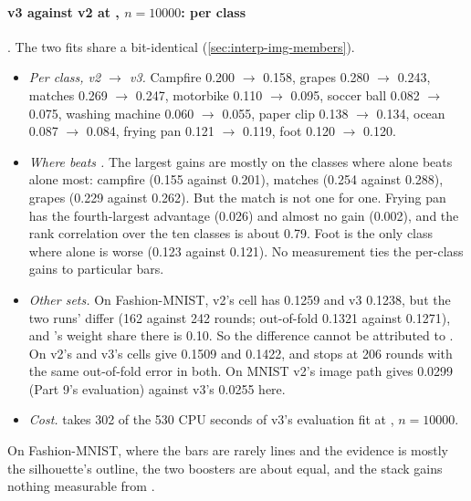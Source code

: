 \paragraph{v3 against v2 at , $n=10000$: per class} . The two fits share a bit-identical  (\cref{sec:interp-img-members}).
\begin{itemize}
\item \emph{Per class, v2 $\to$ v3.} Campfire 0.200 $\to$ 0.158, grapes 0.280 $\to$ 0.243, matches 0.269 $\to$ 0.247, motorbike 0.110 $\to$ 0.095, soccer ball 0.082 $\to$ 0.075, washing machine 0.060 $\to$ 0.055, paper clip 0.138 $\to$ 0.134, ocean 0.087 $\to$ 0.084, frying pan 0.121 $\to$ 0.119, foot 0.120 $\to$ 0.120.
\item \emph{Where  beats .} The largest gains are mostly on the classes where  alone beats  alone most: campfire (0.155 against 0.201), matches (0.254 against 0.288), grapes (0.229 against 0.262). But the match is not one for one. Frying pan has the fourth-largest  advantage (0.026) and almost no gain (0.002), and the rank correlation over the ten classes is about 0.79. Foot is the only class where  alone is worse (0.123 against 0.121). No measurement ties the per-class gains to particular bars.
\item \emph{Other sets.} On Fashion-MNIST, v2's cell has 0.1259 and v3 0.1238, but the two runs'  differ (162 against 242 rounds; out-of-fold 0.1321 against 0.1271), and 's weight share there is 0.10. So the difference cannot be attributed to . On  v2's and v3's cells give 0.1509 and 0.1422, and  stops at 206 rounds with the same out-of-fold error in both. On MNIST v2's image path gives 0.0299 (Part 9's evaluation) against v3's 0.0255 here.
\item \emph{Cost.}  takes 302 of the 530 CPU seconds of v3's evaluation fit at , $n=10000$.
\end{itemize}
On Fashion-MNIST, where the bars are rarely lines and the evidence is mostly the silhouette's outline, the two boosters are about equal, and the stack gains nothing measurable from  .
